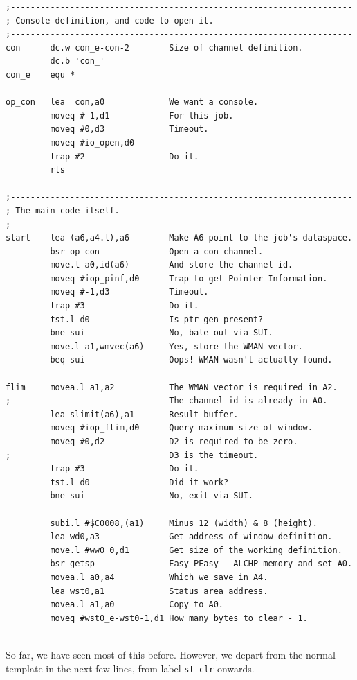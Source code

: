 \begin{lstlisting}[firstnumber=1,]
;---------------------------------------------------------------------
; Console definition, and code to open it.
;---------------------------------------------------------------------
con      dc.w con_e-con-2        Size of channel definition.
         dc.b 'con_'
con_e    equ *

op_con   lea  con,a0             We want a console.
         moveq #-1,d1            For this job.
         moveq #0,d3             Timeout.
         moveq #io_open,d0
         trap #2                 Do it.
         rts

;---------------------------------------------------------------------
; The main code itself.
;---------------------------------------------------------------------
start    lea (a6,a4.l),a6        Make A6 point to the job's dataspace.
         bsr op_con              Open a con channel.
         move.l a0,id(a6)        And store the channel id.
         moveq #iop_pinf,d0      Trap to get Pointer Information.
         moveq #-1,d3            Timeout.
         trap #3                 Do it.
         tst.l d0                Is ptr_gen present?
         bne sui                 No, bale out via SUI.
         move.l a1,wmvec(a6)     Yes, store the WMAN vector.
         beq sui                 Oops! WMAN wasn't actually found.

flim     movea.l a1,a2           The WMAN vector is required in A2.
;                                The channel id is already in A0.
         lea slimit(a6),a1       Result buffer.
         moveq #iop_flim,d0      Query maximum size of window.
         moveq #0,d2             D2 is required to be zero.
;                                D3 is the timeout.
         trap #3                 Do it.
         tst.l d0                Did it work?
         bne sui                 No, exit via SUI.

         subi.l #$C0008,(a1)     Minus 12 (width) & 8 (height).
         lea wd0,a3              Get address of window definition.
         move.l #ww0_0,d1        Get size of the working definition.
         bsr getsp               Easy PEasy - ALCHP memory and set A0.
         movea.l a0,a4           Which we save in A4.
         lea wst0,a1             Status area address.
         movea.l a1,a0           Copy to A0.
         moveq #wst0_e-wst0-1,d1 How many bytes to clear - 1.


\end{lstlisting}

So far, we have seen most of this before. However, we depart from
    the normal template in the next few lines, from label
 \texttt{st\_clr} onwards.

